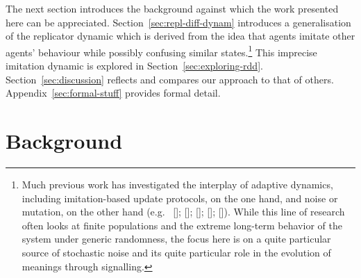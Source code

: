 \documentclass[12pt,english]{article}
\numberwithin{equation}{section}
\newcommand{\citealtbjps}[1]{\citeauthor{#1} [\citeyear{#1}]}
\newcommand{\citepbjps}[1]{(\citeauthor{#1} [\citeyear{#1}])}
\begin{document}

The next section introduces the background against which the work presented here can be
appreciated. Section~\ref{sec:repl-diff-dynam} introduces a generalisation of the replicator
dynamic which is derived from the idea that agents imitate other agents' behaviour while
possibly confusing similar states.\footnote{Much previous work has investigated the interplay
  of adaptive dynamics, including imitation-based update protocols, on the one hand, and noise
  or mutation, on the other hand (e.g.~\citealtbjps{FosterYoung1990:Stochastic-Evol};
  \citealtbjps{FudenbergHarris1992:Evolutionary-Dy};
  \citealtbjps{KandoriMailath1993:Learning-Mutati}; \citealtbjps{Young1993:The-Evolution-o};
  \citealtbjps{FudenbergImhof2006:Imitation-Proce}). While this line of research often looks at
  finite populations and the extreme long-term behavior of the system under generic randomness,
  the focus here is on a quite particular source of stochastic noise and its quite particular
  role in the evolution of meanings through signalling.}  This imprecise imitation dynamic is
explored in Section~\ref{sec:exploring-rdd}. Section~\ref{sec:discussion} reflects and compares
our approach to that of others. Appendix~\ref{sec:formal-stuff} provides formal detail.

\section{Background}
\label{sec:background}

\end{document}

